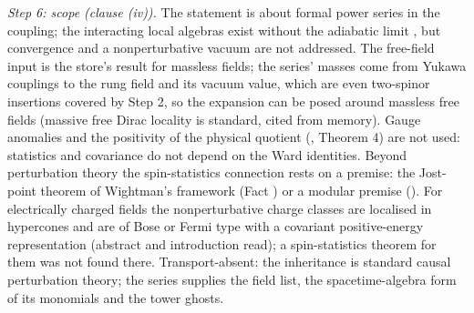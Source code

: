 \emph{Step 6: scope (clause (iv)).} The statement is about formal power series in the coupling; the interacting local algebras exist without the adiabatic limit \cite{DutschFredenhagen1999}, but convergence and a nonperturbative vacuum are not addressed. The free-field input is the store's result for massless fields; the series' masses come from Yukawa couplings to the rung field and its vacuum value, which are even two-spinor insertions covered by Step 2, so the expansion can be posed around massless free fields (massive free Dirac locality is standard, cited from memory). Gauge anomalies and the positivity of the physical quotient (\cite{DutschFredenhagen1999}, Theorem 4) are not used: statistics and covariance do not depend on the Ward identities. Beyond perturbation theory the spin-statistics connection rests on a premise: the Jost-point theorem of Wightman's framework (Fact ) or a modular premise (). For electrically charged fields the nonperturbative charge classes are localised in hypercones and are of Bose or Fermi type with a covariant positive-energy representation \cite{BuchholzRoberts2014} (abstract and introduction read); a spin-statistics theorem for them was not found there. Transport-absent: the inheritance is standard causal perturbation theory; the series supplies the field list, the spacetime-algebra form of its monomials and the tower ghosts.
